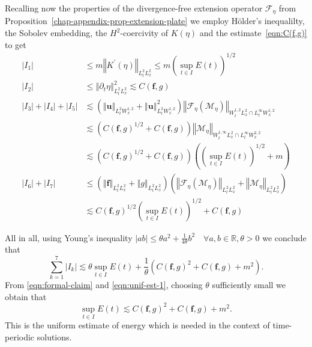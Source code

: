 \documentclass[10pt,a4paper]{article}
\numberwithin{equation}{section}
\begin{document}
Recalling now the properties of the divergence-free extension operator $\mathcal{F}_{\eta}$ from Proposition~\ref{chap-appendix-prop-extension-plate}
we employ  H\"{o}lder's inequalilty,  the Sobolev embedding, the $H^2$-coercivity of $K(\eta)$ and the estimate~\eqref{eqn:C(f,g)} to get 
\begin{equation}\label{eqn:chap02-estimate-K-eta-discrete}
\begin{aligned}\left|I_{1}\right| & \le m\left\Vert K^{\prime}\left(\eta\right)\right\Vert _{L_{t}^{2}L_{x}^{2}}\le m\left(\sup_{t\in I}E\left(t\right)\right)^{1/2}\\
\left|I_{2}\right| & \le\left\Vert \partial_{t}\eta\right\Vert _{L_{t}^{2}L_{x}^{2}}^{2}\lesssim C\left(\mathbf{f},g\right)\\
\left|I_{3}\right|+\left|I_{4}\right|+\left|I_{5}\right| & \lesssim\left(\left\Vert \mathbf{u}\right\Vert _{L_{t}^{2}W_{x}^{1,2}}+\left\Vert \mathbf{u}\right\Vert _{L_{t}^{2}W_{x}^{1,2}}^{2}\right)\left\Vert \mathcal{F}_{\eta}\left(\mathcal{M}_{\eta}\right)\right\Vert _{W_{t}^{1,2}L_{x}^{2}\cap L_{t}^{\infty}W_{x}^{1,2}}\\
 & \lesssim\left(C\left(\mathbf{f},g\right)^{1/2}+C\left(\mathbf{f},g\right)\right)\left\Vert \mathcal{M}_{\eta}\right\Vert _{W_{t}^{1,\infty}L_{x}^{2}\cap L_{t}^{\infty}W_{x}^{2,2}}\\
 & \lesssim\left(C\left(\mathbf{f},g\right)^{1/2}+C\left(\mathbf{f},g\right)\right)\left(\left(\sup_{t\in I}E\left(t\right)\right)^{1/2}+m\right)\\
\left|I_{6}\right|+\left|I_{7}\right| & \le\left(\left\Vert \mathbf{f}\right\Vert _{L_{t}^{2}L_{x}^{2}}+\left\Vert g\right\Vert _{L_{t}^{2}L_{x}^{2}}\right)\left(\left\Vert \mathcal{F}_{\eta}\left(\mathcal{M}_{\eta}\right)\right\Vert _{L_{t}^{2}L_{x}^{2}}+\left\Vert \mathcal{M}_{\eta}\right\Vert _{L_{t}^{2}L_{x}^{2}}\right)\\
 & \lesssim C\left(\mathbf{f},g\right)^{1/2}\left(\sup_{t\in I}E\left(t\right)\right)^{1/2}+C\left(\mathbf{f},g\right)
\end{aligned}
\end{equation}

All in all,  using Young's inequality
$
\left|ab\right|\le\theta a^{2}+\frac{1}{4\theta}b^{2}\quad\forall a,b\in\mathbb{R},\theta>0$
 we conclude that 
\[
\sum_{k=1}^{7}\left|I_{k}\right|\lesssim\theta\sup_{t\in I}E\left(t\right)+\frac{1}{\theta}\left(C\left(\mathbf{f},g\right)^{2}+C\left(\mathbf{f},g\right)+m^{2}\right).
\]
From \eqref{eqn:formal-claim} and \eqref{eqn:unif-est-1}, choosing $\theta$ sufficiently small 
we obtain that
 \begin{equation}\label{eqn:formal-final}
\sup_{t\in I}E\left(t\right)\lesssim C\left(\mathbf{f},g\right)^{2}+C\left(\mathbf{f},g\right)+m^{2}.
\end{equation}
This is the uniform estimate of energy which is needed in the context of time- periodic solutions.
\end{document}
